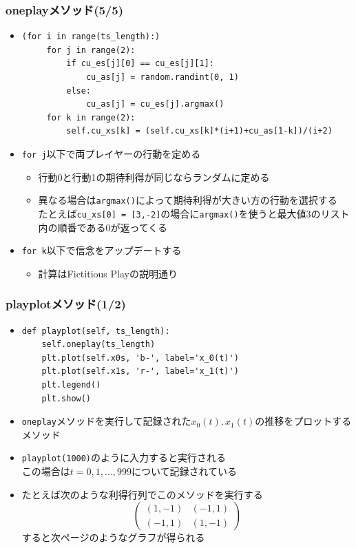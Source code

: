 \documentclass[dvipdfmx,fleqn]{beamer}
\begin{document}
\begin{frame}[fragile]%
\frametitle{oneplayメソッド(5/5)}
\begin{itemize}\setlength{\parskip}{0.5em}
\item
\footnotesize
\begin{verbatim}
(for i in range(ts_length):)
     for j in range(2):
         if cu_es[j][0] == cu_es[j][1]:
             cu_as[j] = random.randint(0, 1)
         else:
             cu_as[j] = cu_es[j].argmax()
     for k in range(2):
         self.cu_xs[k] = (self.cu_xs[k]*(i+1)+cu_as[1-k])/(i+2)
\end{verbatim}\pause
\normalsize
\item
\verb|for j|以下で両プレイヤーの行動を定める
 \begin{itemize}\setlength{\parskip}{0.5em}\pause
 \item
行動0と行動1の期待利得が同じならランダムに定める\pause
 \item
異なる場合は\verb|argmax()|によって期待利得が大きい方の行動を選択する\pause\\
たとえば\verb|cu_xs[0] = [3,-2]|の場合に\verb|argmax()|を使うと最大値3のリスト内の順番である0が返ってくる\pause
\end{itemize}
\item
\verb|for k|以下で信念をアップデートする
\begin{itemize}\setlength{\parskip}{0.5em}
\item
計算はFictitious Playの説明通り
\end{itemize}
\end{itemize}
\end{frame}

\begin{frame}[fragile]%
\frametitle{playplotメソッド(1/2)}
\begin{itemize}\setlength{\parskip}{0.5em}
\item
\footnotesize
\begin{verbatim}
def playplot(self, ts_length):
    self.oneplay(ts_length)
    plt.plot(self.x0s, 'b-', label='x_0(t)')
    plt.plot(self.x1s, 'r-', label='x_1(t)')
    plt.legend()
    plt.show()
\end{verbatim}
\normalsize
\pause
\item
\verb|oneplay|メソッドを実行して記録された$x_0(t),x_1(t)$の推移をプロットするメソッド\pause
\item
\verb|playplot(1000)|のように入力すると実行される\pause\\
この場合は$t=0,1,\dots,999$について記録されている\pause
\item
たとえば次のような利得行列でこのメソッドを実行する
\footnotesize
\begin{equation*}
\begin{pmatrix}
(1,-1) & (-1,1)\\
(-1,1) & (1,-1)
\end{pmatrix}
\end{equation*}\pause
\normalsize
すると次ページのようなグラフが得られる
\end{itemize}
\end{frame}
\end{document}
